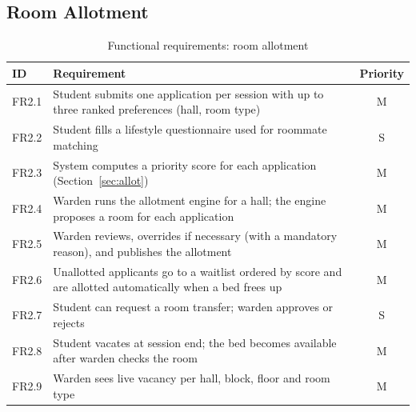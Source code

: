 \documentclass[11pt,a4paper]{report}
\begin{document}
\subsection{Room Allotment}
\begin{table}[H]
\centering\small
\caption{Functional requirements: room allotment}\label{tab:fr-room}
\begin{tabularx}{\textwidth}{lLc}
\toprule
\textbf{ID} & \textbf{Requirement} & \textbf{Priority}\\
\midrule
FR2.1 & Student submits one application per session with up to three ranked preferences (hall, room type) & M\\
FR2.2 & Student fills a lifestyle questionnaire used for roommate matching & S\\
FR2.3 & System computes a priority score for each application (Section~\ref{sec:allot}) & M\\
FR2.4 & Warden runs the allotment engine for a hall; the engine proposes a room for each application & M\\
FR2.5 & Warden reviews, overrides if necessary (with a mandatory reason), and publishes the allotment & M\\
FR2.6 & Unallotted applicants go to a waitlist ordered by score and are allotted automatically when a bed frees up & M\\
FR2.7 & Student can request a room transfer; warden approves or rejects & S\\
FR2.8 & Student vacates at session end; the bed becomes available after warden checks the room & M\\
FR2.9 & Warden sees live vacancy per hall, block, floor and room type & M\\
\bottomrule
\end{tabularx}
\end{table}
\end{document}
